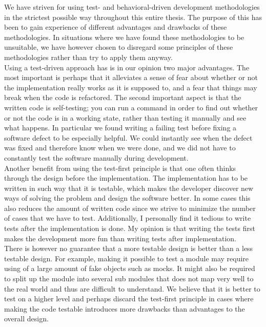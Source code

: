 
We have striven for using test- and behavioral-driven development
methodologies in the strictest possible way throughout this entire
thesis. The purpose of this has been to gain experience of different
advantages and drawbacks of these methodologies. In situations where we
have found these methodologies to be unsuitable, we have however chosen
to disregard some principles of these methodologies rather than try to
apply them anyway.\\

Using a test-driven approach has is in our opinion two major advantages.
The most important is perhaps that it alleviates a sense of fear about
whether or not the implementation really works as it is supposed to, and
a fear that things may break when the code is refactored. The second
important aspect is that the written code is self-testing; you can run a
command in order to find out whether or not the code is in a working
state, rather than testing it manually and see what happens. In
particular we found writing a failing test before fixing a software
defect to be especially helpful. We could instantly see when the defect
was fixed and therefore know when we were done, and we did not have to
constantly test the software manually during development.\\

Another benefit from using the test-first principle is that one often
thinks through the design before the implementation. The implementation
has to be written in such way that it is testable, which makes the
developer discover new ways of solving the problem and design the
software better. In some cases this also reduces the amount of written
code since we strive to minimize the number of cases that we have to
test. Additionally, I personally find it tedious to write tests after
the implementation is done. My opinion is that writing the tests first
makes the development more fun than writing tests after
implementation.\\

There is however no guarantee that a more testable design is better than
a less testable design. For example, making it possible to test a
module may require using of a large amount of fake objects such as
mocks. It might also be required to split up the module into several sub
modules that does not map very well to the real world and thus are
difficult to understand. We believe that it is better to test on a
higher level and perhaps discard the test-first principle in cases where
making the code testable introduces more drawbacks than advantages to
the overall design.\\

